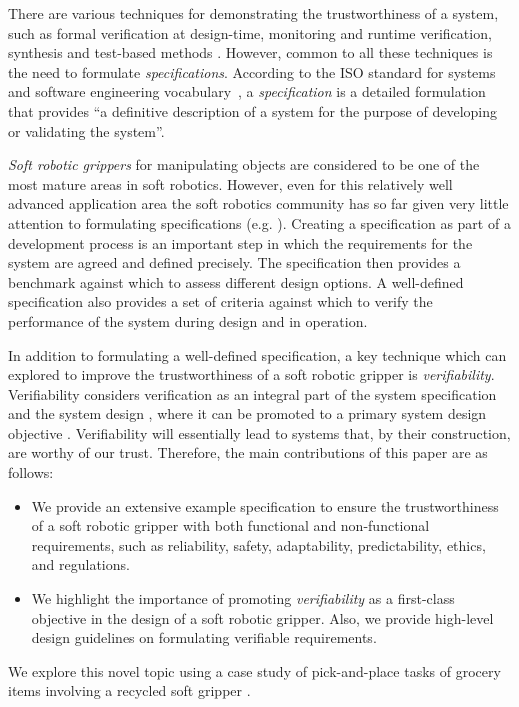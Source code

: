 \documentclass[letterpaper, 10 pt, conference]{ieeeconf}  %
\begin{document}
	There are various techniques for demonstrating the trustworthiness of a system, such as formal verification at design-time, monitoring and runtime verification, synthesis and test-based methods \cite{Abeywickrama2022}. 
	However, common to all these techniques is the need to formulate \emph{specifications}. According to the ISO standard for systems and software engineering vocabulary~\cite{ISO24765:2017}, a \emph{specification} is a detailed formulation that provides ``a definitive description of a system for the purpose of developing or validating the system''. 
	
	\emph{Soft robotic grippers} for manipulating objects are considered to be one of the most mature areas in soft robotics. 
	However, even for this relatively well advanced application area the soft robotics community has so far given very little attention to formulating specifications (e.g. \cite{Shi2023,Cheng2021,Liu2021,Chen2018,Cai2021,Hwang2020,Shin2021}).  Creating a specification as part of a development process is an important step in which the requirements for the system are agreed and defined precisely. %
	The specification then provides a benchmark against which to assess different design options. A well-defined specification also provides a set of criteria against which to verify the performance of the system during design and in operation.
	
	In addition to formulating a well-defined specification, a key technique which can explored to improve the trustworthiness of a soft robotic gripper is \emph{verifiability}. %
	Verifiability considers verification as an integral part of the system specification and the system design \cite{Mousavi2022}, where it can be promoted to a primary system design objective \cite{Eder2021}. 
	Verifiability will essentially lead to systems that, by their construction, are worthy of our trust. 
	Therefore, the main contributions of this paper are as follows:
	\begin{itemize}
		\item We provide an extensive example specification to ensure the trustworthiness of a soft robotic gripper \cite{Partridge2022} with both functional and non-functional requirements, such as reliability, safety, adaptability, predictability, ethics, and regulations.
		\item We highlight the importance of promoting \emph{verifiability} as a first-class objective in the design of a soft robotic gripper. Also, we provide high-level design guidelines on formulating verifiable requirements. 
	\end{itemize}
	We explore this novel topic using a case study of pick-and-place tasks of grocery items \cite{Triantafyllou2019, Sotiropoulos2018} involving a recycled soft gripper \cite{Partridge2022}. 
	
\end{document}
